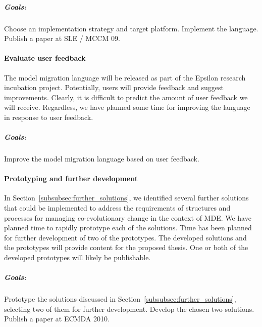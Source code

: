 \subparagraph{Goals:} Choose an implementation strategy and target platform. Implement the language. Publish a paper at SLE / MCCM 09.


\paragraph{Evaluate user feedback}
The model migration language will be released as part of the Epsilon research incubation project. Potentially, users will provide feedback and suggest improvements. Clearly, it is difficult to predict the amount of user feedback we will receive. Regardless, we have planned some time for improving the language in response to user feedback.

\subparagraph{Goals:} Improve the model migration language based on user feedback.


\paragraph{Prototyping and further development}
In Section~\ref{subsubsec:further_solutions}, we identified several further solutions that could be implemented to address the requirements of structures and processes for managing co-evolutionary change in the context of MDE. We have planned time to rapidly prototype each of the solutions. Time has been planned for further development of two of the prototypes. The developed solutions and the prototypes will provide content for the proposed thesis. One or both of the developed prototypes will likely be publishable.

\subparagraph{Goals:} Prototype the solutions discussed in Section~\ref{subsubsec:further_solutions}, selecting two of them for further development. Develop the chosen two solutions. Publish a paper at ECMDA 2010.